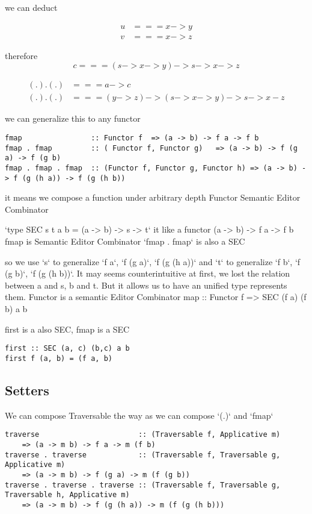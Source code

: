\begin{WrapText}
we can deduct

\begin{align*}
u &=== x -> y  \\
v &=== x -> z
\end{align*}

therefore \begin{equation}c === (s -> x -> y) -> s -> x -> z\end{equation}

\begin{align*}
(.).(.) & === a -> c \\
(.).(.) & === (y -> z) -> (s -> x -> y) -> s -> x - z
\end{align*}
\end{WrapText}

we can generalize this to any functor

\begin{verbatim}
fmap                :: Functor f  => (a -> b) -> f a -> f b
fmap . fmap         :: ( Functor f, Functor g)   => (a -> b) -> f (g a) -> f (g b)
fmap . fmap . fmap  :: (Functor f, Functor g, Functor h) => (a -> b) -> f (g (h a)) -> f (g (h b))
\end{verbatim}

it means we compose a function under arbitrary depth Functor
Semantic Editor Combinator

`type SEC s t a b = (a -> b) -> s -> t`
it like a functor (a -> b) -> f a -> f b
fmap is Semantic Editor Combinator
`fmap . fmap` is also a SEC

so we use `s` to generalize `f a`,  `f (g a)`, `f (g (h a))` and `t` to generalize `f b`,  `f (g b)`, `f (g (h b))`.
It may seems counterintuitive at first, we lost the relation between a and s, b and t. But it allows us to have an unified type represents them.
Functor is a semantic Editor Combinator
map :: Functor f => SEC (f a) (f b) a b

first is a also SEC, fmap is a SEC

\begin{verbatim}
first :: SEC (a, c) (b,c) a b
first f (a, b) = (f a, b)
\end{verbatim}


\subsection{Setters}
We can compose Traversable the way as we can compose `(.)` and `fmap`

\begin{verbatim}
traverse                       :: (Traversable f, Applicative m)
    => (a -> m b) -> f a -> m (f b)
traverse . traverse            :: (Traversable f, Traversable g, Applicative m)
    => (a -> m b) -> f (g a) -> m (f (g b))
traverse . traverse . traverse :: (Traversable f, Traversable g, Traversable h, Applicative m)
    => (a -> m b) -> f (g (h a)) -> m (f (g (h b)))
\end{verbatim}

